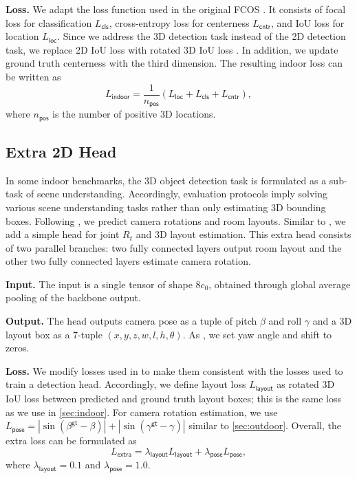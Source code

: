 \documentclass[10pt,twocolumn,letterpaper]{article}
\begin{document}
\textbf{Loss.} We adapt the loss function used in the original FCOS \cite{tian2019fcos}. It consists of focal loss for classification $L_\mathsf{cls}$, cross-entropy loss for centerness $L_\mathsf{cntr}$, and IoU loss for location $L_\mathsf{loc}$. Since we address the 3D detection task instead of the 2D detection task, we replace 2D IoU loss with rotated 3D IoU loss \cite{zhou2019iou}. In addition, we update ground truth centerness with the third dimension.
The resulting indoor loss can be written as \[L_\mathsf{indoor}=\frac{1}{n_\mathsf{pos}}(L_\mathsf{loc} + L_\mathsf{cls} + L_\mathsf{cntr}),\]
where $n_\mathsf{pos}$ is the number of positive 3D locations.

\subsection{Extra 2D Head}

In some indoor benchmarks, the 3D object detection task is formulated as a sub-task of scene understanding. Accordingly, evaluation protocols imply solving various scene understanding tasks rather than only estimating 3D bounding boxes. Following \cite{huang2018holistic, huang2018cooperative, nie2020total3dunderstanding}, we predict camera rotations and room layouts. Similar to \cite{nie2020total3dunderstanding}, we add a simple head for joint $R_t$ and 3D layout estimation. This extra head consists of two parallel branches: two fully connected layers output room layout and the other two fully connected layers estimate camera rotation.

\textbf{Input.} The input is a single tensor of shape $8c_0$, obtained through global average pooling of the backbone output.

\textbf{Output.} The head outputs camera pose as a tuple of pitch $\beta$ and roll $\gamma$ and a 3D layout box as a 7-tuple $(x, y, z, w, l, h, \theta)$. As \cite{nie2020total3dunderstanding}, we set yaw angle and shift to zeros.

\textbf{Loss.} We modify losses used in \cite{nie2020total3dunderstanding} to make them consistent with the losses used to train a detection head. Accordingly, we define layout loss $L_\mathsf{layout}$ as rotated 3D IoU loss between predicted and ground truth layout boxes; this is the same loss as we use in \ref{sec:indoor}. For camera rotation estimation, we use $L_\mathsf{pose} = |\sin(\beta^\mathsf{gt}-\beta)|+|\sin(\gamma^\mathsf{gt}-\gamma)|$ similar to \ref{sec:outdoor}. Overall, the extra loss can be formulated as
\[L_\mathsf{extra}=\lambda_\mathsf{layout}L_\mathsf{layout}+\lambda_\mathsf{pose}L_\mathsf{pose},\]
where $\lambda_\mathsf{layout}=0.1$ and $\lambda_\mathsf{pose}=1.0$.
\end{document}
